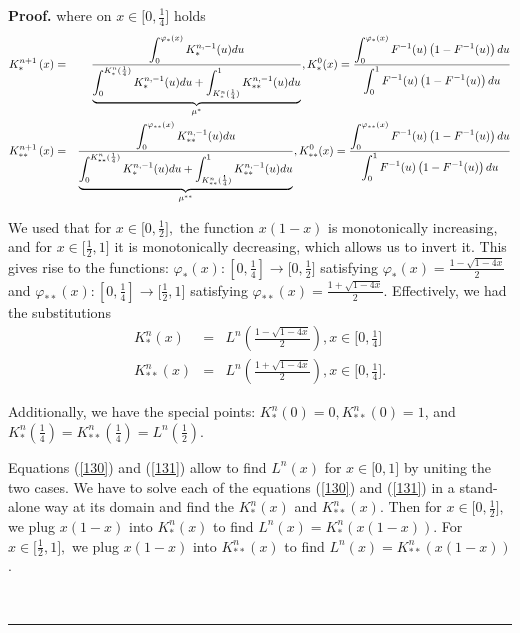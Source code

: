 \documentclass[onecolumn]{article}
\providecommand{\dint}{\displaystyle\int}
\newenvironment{proof}[1][Proof]{\noindent\textbf{#1.} }{\ \rule{0.5em}{0.5em}}
\renewcommand{\dint}{\displaystyle\int}
\begin{document}
\begin{proof}
where on $x\in \lbrack 0,\frac{1}{4}]$ holds%
\begin{eqnarray}
K_{\ast }^{n+1}\left( x\right) &=&\frac{\dint\nolimits_{0}^{\varphi _{\ast
}(x)}K_{\ast }^{n,-1}(u)du}{\underset{\mu ^{\ast }}{\underbrace{%
\dint\nolimits_{0}^{K_{\ast }^{n}(\frac{1}{4})}K_{\ast
}^{n,-1}(u)du+\dint\nolimits_{K_{\ast }^{n}(\frac{1}{4})}^{1}K_{\ast \ast
}^{n,-1}(u)du}}},K_{\ast }^{0}(x)=\frac{\dint\nolimits_{0}^{\varphi _{\ast
}(x)}F^{-1}(u)\left( 1-F^{-1}(u)\right) du}{\dint\nolimits_{0}^{1}F^{-1}(u)%
\left( 1-F^{-1}(u)\right) du}  \label{130} \\
K_{\ast \ast }^{n+1}\left( x\right) &=&\frac{\dint\nolimits_{0}^{\varphi
_{\ast \ast }(x)}K_{\ast \ast }^{n,-1}(u)du}{\underset{\mu ^{\ast \ast }}{%
\underbrace{\dint\nolimits_{0}^{K_{\ast \ast }^{n}(\frac{1}{4})}K_{\ast
}^{n,-1}(u)du+\dint\nolimits_{K_{\ast \ast }^{n}(\frac{1}{4})}^{1}K_{\ast
\ast }^{n,-1}(u)du}}},K_{\ast \ast }^{0}(x)=\frac{\dint\nolimits_{0}^{%
\varphi _{\ast \ast }(x)}F^{-1}(u)\left( 1-F^{-1}(u)\right) du}{%
\dint\nolimits_{0}^{1}F^{-1}(u)\left( 1-F^{-1}(u)\right) du}  \label{131}
\end{eqnarray}

We used that for $x\in \lbrack 0,\frac{1}{2}],$ the function $x(1-x)$ is
monotonically increasing, and for $x\in \lbrack \frac{1}{2},1]$ it is
monotonically decreasing, which allows us to invert it. This gives rise to
the functions: $\varphi _{\ast }(x):[0,\frac{1}{4}]\rightarrow \lbrack 0,%
\frac{1}{2}]$ satisfying $\varphi _{\ast }(x)=\frac{1-\sqrt{1-4x}}{2}$ and $%
\varphi _{\ast \ast }(x):[0,\frac{1}{4}]\rightarrow \lbrack \frac{1}{2},1]$
satisfying $\varphi _{\ast \ast }(x)=\frac{1+\sqrt{1-4x}}{2}$. Effectively,
we had the substitutions%
\begin{eqnarray}
K_{\ast }^{n}(x) &=&L^{n}\left( \frac{1-\sqrt{1-4x}}{2}\right) ,x\in \lbrack
0,\frac{1}{4}]  \label{133} \\
K_{\ast \ast }^{n}(x) &=&L^{n}\left( \frac{1+\sqrt{1-4x}}{2}\right) ,x\in
\lbrack 0,\frac{1}{4}].  \label{134}
\end{eqnarray}

Additionally, we have the special points: $K_{\ast }^{n}(0)=0,K_{\ast \ast
}^{n}(0)=1$, and $K_{\ast }^{n}(\frac{1}{4})=K_{\ast \ast }^{n}(\frac{1}{4}%
)=L^{n}(\frac{1}{2})$.

Equations (\ref{130}) and (\ref{131}) allow to find $L^{n}\left( x\right) $
for $x\in \lbrack 0,1]$ by uniting the two cases. We have to solve each of
the equations (\ref{130}) and (\ref{131}) in a stand-alone way at its domain
and find the $K_{\ast }^{n}(x)$ and $K_{\ast \ast }^{n}(x)$. Then for $x\in
\lbrack 0,\frac{1}{2}],$ we plug $x(1-x)$ into $K_{\ast }^{n}(x)$ to find $%
L^{n}\left( x\right) =K_{\ast }^{n}(x(1-x))$. For $x\in \lbrack \frac{1}{2}%
,1],$ we plug $x(1-x)$ into $K_{\ast \ast }^{n}(x)$ to find $L^{n}\left(
x\right) =K_{\ast \ast }^{n}(x(1-x))$.


\end{proof}
\end{document}
